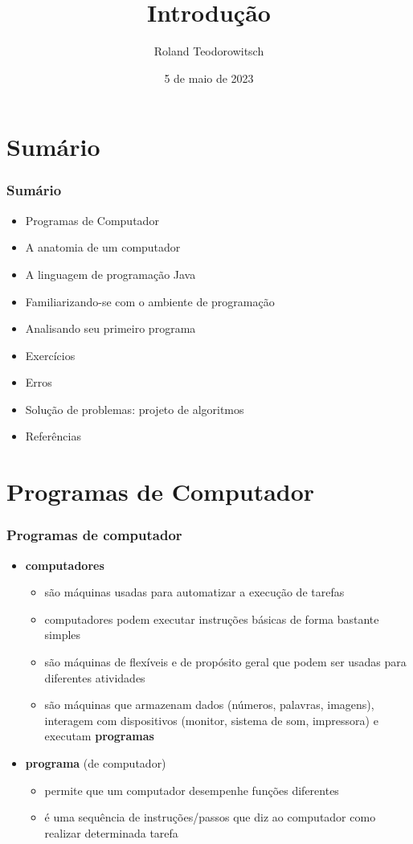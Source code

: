 \documentclass[aspectratio=169]{beamer}
\title[\sc{Introdução}]{Introdução}
\author[Roland Teodorowitsch]{Roland Teodorowitsch}
\institute[FPROG - EP - PUCRS]{Fundamentos de Programação - Escola Politécnica - PUCRS}
\date{5 de maio de 2023}
\begin{document}
\justifying

\begin{frame}
	\titlepage
\end{frame}

\section{Sumário}

\begin{frame}\frametitle{Sumário}
\begin{itemize}
	\item Programas de Computador
	\item A anatomia de um computador
	\item A linguagem de programação Java
	\item Familiarizando-se com o ambiente de programação
	\item Analisando seu primeiro programa
	\item Exercícios
	\item Erros
	\item Solução de problemas: projeto de algoritmos
	\item Referências
\end{itemize}
\end{frame}


\section{Programas de Computador}

\begin{frame}\frametitle{Programas de computador}
\begin{itemize}
	\item \textbf{computadores}
	\begin{itemize}
		\item são máquinas usadas para automatizar a execução de tarefas
		\item computadores podem executar instruções básicas de forma bastante simples
		\item são máquinas de flexíveis e de propósito geral que podem ser usadas para diferentes atividades
		\item são máquinas que armazenam dados (números, palavras, imagens), interagem com dispositivos (monitor, sistema de som, impressora) e executam \textbf{programas}
	\end{itemize}
	\item \textbf{programa} (de computador)
	\begin{itemize}
		\item permite que um computador desempenhe funções diferentes
		\item é uma sequência de instruções/passos que diz ao computador como realizar determinada tarefa
	\end{itemize}
\end{itemize}
\end{frame}
\end{document}
